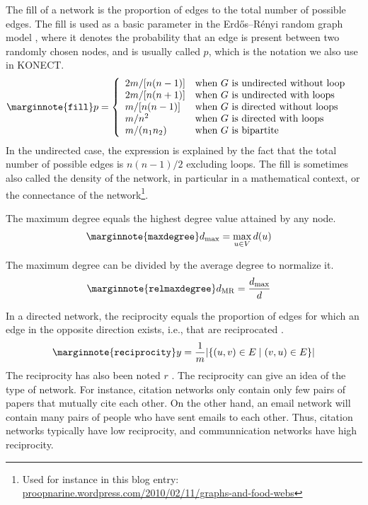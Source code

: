 \documentclass{article}
\begin{document}
The fill of a network is the proportion of edges to the total
number of possible edges. 
The fill is used as a basic parameter in the Erdős--Rényi random graph
model \citep{b569}, where it denotes the probability that an edge is present between
two randomly chosen nodes, and is usually called $p$, which is the
notation we also use in KONECT. 
\begin{align}
  \marginnote{\texttt{fill}}
  p &= \left\{ \begin{array}{ll}
    2m / [n(n-1)] & \text{when $G$ is undirected without loop} \\
    2m / [n(n+1)] & \text{when $G$ is undirected with loops} \\
    m / [n(n-1)] & \text{when $G$ is directed without loops} \\
    m / n^2 & \text{when $G$ is directed with loops} \\
    m / (n_1 n_2) & \text{when $G$ is bipartite} 
  \end{array}\right. 
\end{align}
In the undirected case, the expression is explained by the fact that the
total number of possible edges is $n(n-1)/2$ excluding loops.  
The fill is sometimes also called the density of the network, in
particular in a mathematical context, or the connectance of the
network\footnote{Used for instance in this blog entry:  \href{https://proopnarine.wordpress.com/2010/02/11/graphs-and-food-webs/}{proopnarine.wordpress.com/2010/02/11/graphs-and-food-webs}}. 

The maximum degree equals the highest degree value attained
by any node.
\begin{align}
  \marginnote{\texttt{maxdegree}}
  d_{\max} &= \max_{u\in V} d(u)
\end{align}

The maximum degree can be divided by the average degree to normalize it.
\begin{align}
  \marginnote{\texttt{relmaxdegree}}
  d_{\mathrm{MR}} &= \frac {d_{\max}} {d}
\end{align}

In a directed network, the reciprocity equals the proportion of edges
for which an edge in the opposite direction exists, i.e., that are
reciprocated \citep{b866}.  
\begin{align}
  \marginnote{\texttt{reciprocity}}
  y = \frac 1 m  | \{ (u,v) \in E \mid (v,u) \in E \} | 
\end{align}
The reciprocity has also been noted $r$ \citep[e.g.][]{b867}. 
The reciprocity can give an idea of the type of network.  For instance,
citation networks only contain only few pairs of papers that mutually
cite each other.  On the other hand, an email network will contain many
pairs of people who have sent emails to each other.  Thus, citation
networks typically have low reciprocity, and communnication networks
have high reciprocity. 
\end{document}

